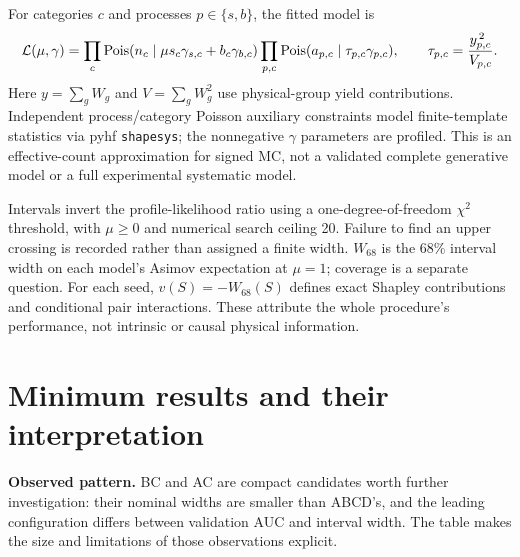 \documentclass[11pt,a4paper]{article}
\newcommand{\W}{W_{68}}
\newcommand{\Pois}{\mathrm{Pois}}
\begin{document}
For categories $c$ and processes $p\in\{s,b\}$, the fitted model is
\[
 {\cal L}(\mu,\gamma)=
 \prod_c\Pois(n_c\mid\mu s_c\gamma_{s,c}+b_c\gamma_{b,c})
 \prod_{p,c}\Pois(a_{p,c}\mid\tau_{p,c}\gamma_{p,c}),
 \qquad \tau_{p,c}=\frac{y_{p,c}^{\,2}}{V_{p,c}} .
\]
Here $y=\sum_g W_g$ and $V=\sum_g W_g^2$ use physical-group yield contributions.
Independent process/category Poisson auxiliary constraints model finite-template
statistics via pyhf \texttt{shapesys}; the nonnegative $\gamma$ parameters are
profiled. This is an effective-count approximation for signed MC, not a
validated complete generative model or a full experimental systematic model.

Intervals invert the profile-likelihood ratio using a one-degree-of-freedom
$\chi^2$ threshold, with $\mu\geq0$ and numerical search ceiling 20.
Failure to find an upper crossing is recorded rather than assigned a finite width.
$\W$ is the 68\% interval width
on each model's Asimov expectation at $\mu=1$; coverage is a separate question.
For each seed, $v(S)=-\W(S)$ defines exact Shapley contributions and conditional
pair interactions. These attribute the whole procedure's performance, not
intrinsic or causal physical information.

\newpage
\section{Minimum results and their interpretation}
\textbf{Observed pattern.} BC and AC are compact candidates worth further
investigation: their nominal widths are smaller than ABCD's, and the leading
configuration differs between validation AUC and interval width. The table
makes the size and limitations of those observations explicit.
\end{document}
